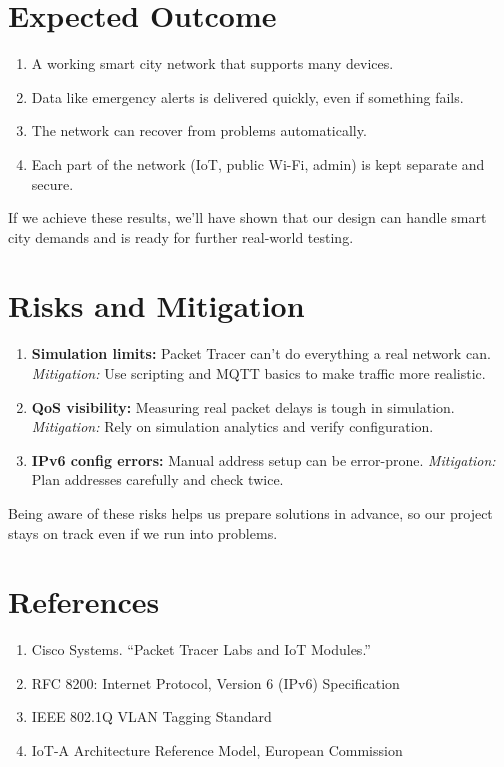 \documentclass[12pt,a4paper]{article}
\begin{document}
\newpage

\section*{Expected Outcome}
\begin{enumerate}[label=7.\arabic*, nosep]
    \item A working smart city network that supports many devices.
    \item Data like emergency alerts is delivered quickly, even if something fails.
    \item The network can recover from problems automatically.
    \item Each part of the network (IoT, public Wi-Fi, admin) is kept separate and secure.
\end{enumerate}
If we achieve these results, we’ll have shown that our design can handle smart city demands and is ready for further real-world testing.

\vspace{1em}

\section*{Risks and Mitigation}
\begin{enumerate}[label=8.\arabic*, nosep]
    \item \textbf{Simulation limits:} Packet Tracer can’t do everything a real network can.
    \textit{Mitigation:} Use scripting and MQTT basics to make traffic more realistic.
    \item \textbf{QoS visibility:} Measuring real packet delays is tough in simulation.
    \textit{Mitigation:} Rely on simulation analytics and verify configuration.
    \item \textbf{IPv6 config errors:} Manual address setup can be error-prone.
    \textit{Mitigation:} Plan addresses carefully and check twice.
\end{enumerate}
Being aware of these risks helps us prepare solutions in advance, so our project stays on track even if we run into problems.

\vspace{1em}

\section*{References}
\begin{enumerate}[label=9.\arabic*, nosep]
    \item Cisco Systems. ``Packet Tracer Labs and IoT Modules.''
    \item RFC 8200: Internet Protocol, Version 6 (IPv6) Specification
    \item IEEE 802.1Q VLAN Tagging Standard
    \item IoT-A Architecture Reference Model, European Commission
\end{enumerate}
\end{document}
